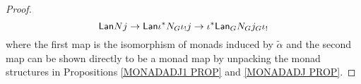\documentclass[a4paper,10pt]{article}%
\begin{document}
\begin{proof}
  \[
  \mathsf{Lan} N j \to 
  \mathsf{Lan} \iota^{\**} N_G \iota_! j  \to
  \iota^{\**} \mathsf{Lan}_G  N_G  j_G \iota_!
  \]
  where the first map is the isomorphism of monads induced by $\tilde{\alpha}$ and the second map can be shown directly to be a monad map by unpacking the monad structures in 
  Propositions \ref{MONADADJ1 PROP} and \ref{MONADADJ PROP}.
\end{proof}
\end{document}
